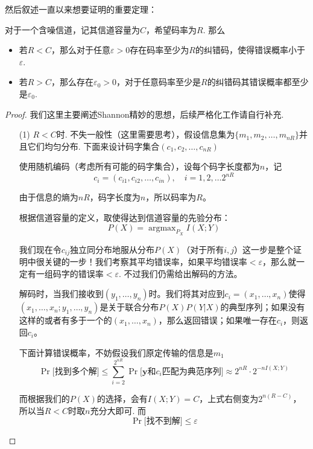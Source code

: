 然后叙述一直以来想要证明的重要定理：
\begin{theorem}
    对于一个含噪信道，记其信道容量为$C$，希望码率为$R$. 那么 
    \begin{itemize}
        \item 若$R < C$，那么对于任意$\varepsilon > 0$存在码率至少为$R$的纠错码，使得错误概率小于$\varepsilon$.
        \item 若$R > C$，那么存在$\varepsilon_0 > 0$，对于任意码率至少是$R$的纠错码其错误概率都至少是$\varepsilon_0$.
    \end{itemize}
\end{theorem}
\begin{proof}
    我们这里主要阐述Shannon精妙的思想，后续严格化工作请自行补充.  
    \begin{enumerate}
        \item[(1)] $R<C$时. 不失一般性（这里需要思考），假设信息集为$\{m_1,m_2,\dots, m_{nR}\}$并且它们均匀分布. 下面来设计码字集合$(c_1,c_2,\dots, c_{nR})$ 
        
        使用随机编码（考虑所有可能的码字集合），设每个码字长度都为$n$，记 
        \[
        c_i = (c_{i1}, c_{i2},\dots, c_{in}), \quad i = 1,2,\dots 2^{nR}
        \]

        由于信息的熵为$nR$，码字长度为$n$，所以码率为$R$。

        根据信道容量的定义，取使得达到信道容量的先验分布：
        \[
        P(X) = \mathop{\arg\max}_{P_X} I(X;Y)
        \]

        我们现在令$c_{ij}$独立同分布地服从分布$P(X)$（对于所有$i,j$）这一步是整个证明中很关键的一步！我们考察其平均错误率，如果平均错误率$< \varepsilon$，那么就一定有一组码字的错误率$< \varepsilon$.  不过我们仍需给出解码的方法。

        解码时，当我们接收到$(y_1, \dots, y_n)$时。我们将其对应到$c_i = (x_1, \dots, x_n)$使得$(x_1,\dots, x_n; y_1,\dots, y_n)$是关于联合分布$P(X)P(Y|X)$的典型序列；如果没有这样的或者有多于一个的$(x_1,\dots, x_n)$，那么返回错误；如果唯一存在$c_i$，则返回$c_i$。

        下面计算错误概率，不妨假设我们原定传输的信息是$m_1$
        \[
        \Pr\Big[\text{找到多个解}\Big] \le \sum_{i=2}^{2^{nR}} \Pr\Big[\bm{y}\text{和}c_i\text{匹配为典范序列}\Big] \approx 2^{nR} \cdot 2^{-n I(X;Y)}
        \]

        而根据我们的$P(X)$的选择，会有$I(X;Y) = C$，上式右侧变为$2^{n(R-C)}$，所以当$R<C$时取$n$充分大即可. 而 
        \[
        \Pr\Big[\text{找不到解}\Big] \le \varepsilon
        \]


\end{enumerate}
\end{proof}
